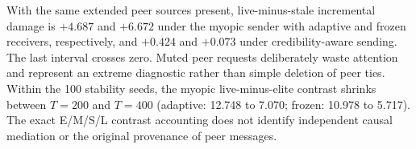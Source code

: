 With the same extended peer sources present, live-minus-stale incremental damage is $+4.687$ and $+6.672$ under the myopic sender with adaptive and frozen receivers, respectively, and $+0.424$ and $+0.073$ under credibility-aware sending. The last interval crosses zero. Muted peer requests deliberately waste attention and represent an extreme diagnostic rather than simple deletion of peer ties. Within the 100 stability seeds, the myopic live-minus-elite contrast shrinks between $T=200$ and $T=400$ (adaptive: 12.748 to 7.070; frozen: 10.978 to 5.717). The exact E/M/S/L contrast accounting does not identify independent causal mediation or the original provenance of peer messages.
